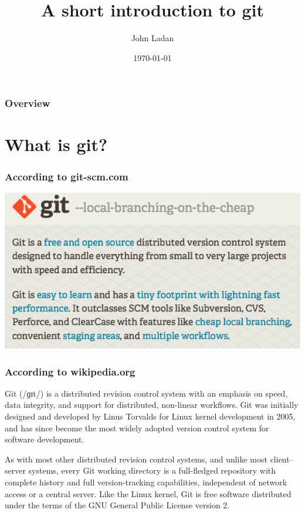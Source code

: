 \documentclass{beamer}
\title[git]{A short introduction to git}
\author{John Ladan}
\institute[Waterloo]{University of Waterloo\\john@ladan.ca}
\date{\today}
\begin{document}
\begin{frame}
    \titlepage
\end{frame}

\begin{frame}
    \frametitle{Overview}
    \tableofcontents
\end{frame}


\section{What is git?}

\begin{frame}
    \frametitle{According to git-scm.com}
    \includegraphics{figures/git-homepage}
\end{frame}

\begin{frame}
    \frametitle{According to wikipedia.org}
    Git (/ɡɪt/) is a distributed revision control system with an emphasis on speed, data integrity, and support for distributed, non-linear workflows. Git was initially designed and developed by Linus Torvalds for Linux kernel development in 2005, and has since become the most widely adopted version control system for software development.

    As with most other distributed revision control systems, and unlike most client–server systems, every Git working directory is a full-fledged repository with complete history and full version-tracking capabilities, independent of network access or a central server. Like the Linux kernel, Git is free software distributed under the terms of the GNU General Public License version 2.
\end{frame}
\end{document}
